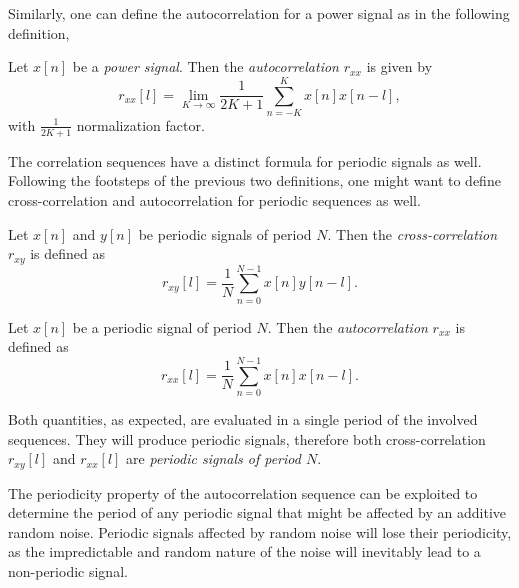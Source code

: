 \documentclass[\documentfontsize, twocolumn]{\classname}
\begin{document}
Similarly, one can define the autocorrelation for a power signal as in the following definition,
\begin{defin}
    Let $x[n]$ be a \emph{power signal}. Then the \emph{autocorrelation} $r_{xx}$ is given by
    \begin{equation}\label{eqn:autoCorrelationPowerSignals}
        r_{xx}[l] = \lim_{K\rightarrow \infty} \frac 1 {2K+1} \sum_{n=-K}^K x[n]x[n-l],
    \end{equation}
    with $\frac 1 {2K+1}$ normalization factor.
\end{defin}

The correlation sequences have a distinct formula for periodic signals as well. Following the footsteps of the previous two definitions, one might want to define cross-correlation and autocorrelation for periodic sequences as well.

\begin{defin}
    Let $x[n]$ and $y[n]$ be periodic signals of period $N$. Then the \emph{cross-correlation} $r_{xy}$ is defined as
    \begin{equation}\label{eqn:crossCorrelationPeriodicSignals}
        r_{xy}[l] = \frac 1 N \sum_{n=0}^{N-1} x[n]y[n-l].
    \end{equation}
\end{defin}

\begin{defin}
    Let $x[n]$ be a periodic signal of period $N$. Then the \emph{autocorrelation} $r_{xx}$ is defined as
    \begin{equation}\label{eqn:autoCorrelationPeriodicSignals}
        r_{xx}[l] = \frac 1 N \sum_{n=0}^{N-1} x[n]x[n-l].
    \end{equation}
\end{defin}

Both quantities, as expected, are evaluated in a single period of the involved sequences. They will produce periodic signals, therefore both cross-correlation $r_{xy}[l]$ and $r_{xx}[l]$ are \emph{periodic signals of period $N$}.

The periodicity property of the autocorrelation sequence can be exploited to determine the period of any periodic signal that might be affected by an additive random noise. Periodic signals affected by random noise will lose their periodicity, as the impredictable and random nature of the noise will inevitably lead to a non-periodic signal.
\end{document}
